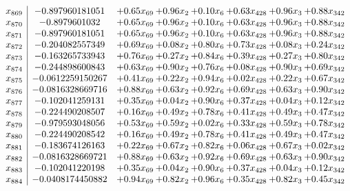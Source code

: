 \documentclass[8pt]{article}
\begin{document}
\[\begin{array}{c| c c@{\hskip 2pt} c@{\hskip 2pt} c@{\hskip 2pt} c@{\hskip 2pt} c@{\hskip 2pt} c@{\hskip 2pt} }
 x_{869}   &  -0.897960181051 & +  0.65 x_{69} & +  0.96 x_{2} & +  0.10 x_{6} & +  0.63 x_{428} & +  0.96 x_{3} & +  0.88 x_{342}\\
 x_{870}   &  -0.8979601032 & +  0.65 x_{69} & +  0.96 x_{2} & +  0.10 x_{6} & +  0.63 x_{428} & +  0.96 x_{3} & +  0.88 x_{342}\\
 x_{871}   &  -0.897960181051 & +  0.65 x_{69} & +  0.96 x_{2} & +  0.10 x_{6} & +  0.63 x_{428} & +  0.96 x_{3} & +  0.88 x_{342}\\
 x_{872}   &  -0.204082557349 & +  0.69 x_{69} & +  0.08 x_{2} & +  0.80 x_{6} & +  0.73 x_{428} & +  0.08 x_{3} & +  0.24 x_{342}\\
 x_{873}   &  -0.163265733943 & +  0.76 x_{69} & +  0.27 x_{2} & +  0.84 x_{6} & +  0.39 x_{428} & +  0.27 x_{3} & +  0.80 x_{342}\\
 x_{874}   &  -0.244898600843 & +  0.63 x_{69} & +  0.90 x_{2} & +  0.76 x_{6} & +  0.08 x_{428} & +  0.90 x_{3} & +  0.69 x_{342}\\
 x_{875}   &  -0.0612259150267 & +  0.41 x_{69} & +  0.22 x_{2} & +  0.94 x_{6} & +  0.02 x_{428} & +  0.22 x_{3} & +  0.67 x_{342}\\
 x_{876}   &  -0.0816328669716 & +  0.88 x_{69} & +  0.63 x_{2} & +  0.92 x_{6} & +  0.69 x_{428} & +  0.63 x_{3} & +  0.90 x_{342}\\
 x_{877}   &  -0.102041259131 & +  0.35 x_{69} & +  0.04 x_{2} & +  0.90 x_{6} & +  0.37 x_{428} & +  0.04 x_{3} & +  0.12 x_{342}\\
 x_{878}   &  -0.224490208507 & +  0.16 x_{69} & +  0.49 x_{2} & +  0.78 x_{6} & +  0.41 x_{428} & +  0.49 x_{3} & +  0.47 x_{342}\\
 x_{879}   &  -0.979593048056 & +  0.53 x_{69} & +  0.59 x_{2} & +  0.02 x_{6} & +  0.33 x_{428} & +  0.59 x_{3} & +  0.78 x_{342}\\
 x_{880}   &  -0.224490208542 & +  0.16 x_{69} & +  0.49 x_{2} & +  0.78 x_{6} & +  0.41 x_{428} & +  0.49 x_{3} & +  0.47 x_{342}\\
 x_{881}   &  -0.183674126163 & +  0.22 x_{69} & +  0.67 x_{2} & +  0.82 x_{6} & +  0.06 x_{428} & +  0.67 x_{3} & +  0.02 x_{342}\\
 x_{882}   &  -0.0816328669721 & +  0.88 x_{69} & +  0.63 x_{2} & +  0.92 x_{6} & +  0.69 x_{428} & +  0.63 x_{3} & +  0.90 x_{342}\\
 x_{883}   &  -0.102041220198 & +  0.35 x_{69} & +  0.04 x_{2} & +  0.90 x_{6} & +  0.37 x_{428} & +  0.04 x_{3} & +  0.12 x_{342}\\
 x_{884}   &  -0.0408174450882 & +  0.94 x_{69} & +  0.82 x_{2} & +  0.96 x_{6} & +  0.35 x_{428} & +  0.82 x_{3} & +  0.45 x_{342}\\

\end{array}\]
\end{document}
